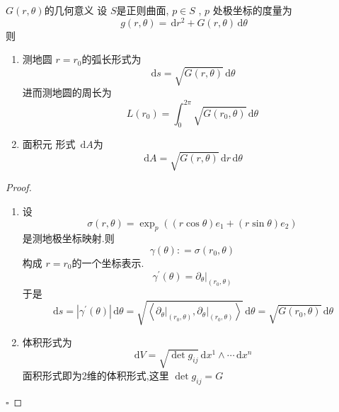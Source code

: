 \documentclass[../../main.tex]{subfiles}
\begin{document}
\begin{theorem}{\(  G\left( r, \theta  \right)   \)的几何意义 }
    设 \(  S  \)是正则曲面, \(  p \in S  \) ,  \(  p  \) 处极坐标的度量为 \[
   g\left( r, \theta  \right) = \,\mathrm{d} r^{2}+ G\left( r, \theta  \right)\,\mathrm{d}  \theta 
    \]   则  \begin{enumerate}
        \item 测地圆 \(  r= r_0  \)的弧长形式为 \[
    \,\mathrm{d} s= \sqrt{G\left( r, \theta  \right) }\,\mathrm{d}  \theta 
    \] 进而测地圆的周长为 \[
    L\left( r_0 \right)= \int_{0}^{2\pi }\sqrt{G\left( r_0, \theta  \right) }\,\mathrm{d}  \theta  
    \]
    \item 面积元 形式 \(  \,\mathrm{d} A  \)为 \[
    \,\mathrm{d} A= \sqrt{G\left( r, \theta  \right) }\,\mathrm{d} r\,\mathrm{d}  \theta 
    \] 
    \end{enumerate}
    
\end{theorem}
\begin{proof}
    \begin{enumerate}
        \item 设 \[
     \sigma \left( r, \theta  \right)= \exp _{p}\left( \left( r\cos  \theta  \right)e_1+ \left( r\sin  \theta  \right)e_2   \right)  
    \]是测地极坐标映射.则 \[
     \gamma \left(  \theta  \right): =   \sigma \left( r_0, \theta  \right)
    \]构成 \(  r= r_0  \)的一个坐标表示. \[
     \gamma ^{\prime} \left(  \theta  \right)=\left.  \partial _{ \theta } \right|_{\left( r_0, \theta  \right) }
    \] 于是 \[
    \,\mathrm{d} s= \left|  \gamma ^{\prime} \left(  \theta  \right)  \right|\,\mathrm{d}  \theta = \sqrt{\left<\left.  \partial _{ \theta } \right|_{\left( r_0, \theta  \right) },\left.  \partial _{ \theta } \right|_{\left( r_0, \theta  \right) } \right>}\,\mathrm{d}  \theta = \sqrt{G\left( r_0, \theta  \right) }\,\mathrm{d}  \theta  
    \]

    \item 体积形式为 \[
    \,\mathrm{d} V= \sqrt{\det g_{ij}}\,\mathrm{d} x^{1}\wedge \cdots \,\mathrm{d} x^{n}
    \]面积形式即为2维的体积形式,这里 \(  \det g_{ij}= G  \) 
    \end{enumerate}
    
    \hfill $\square$
\end{proof}
\end{document}
